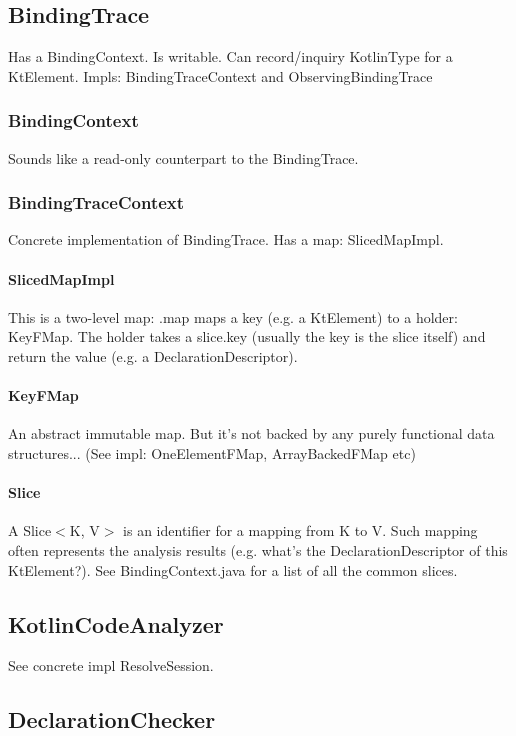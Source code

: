 \documentclass{article}
\begin{document}
\subsection{BindingTrace}
Has a BindingContext. Is writable. Can record/inquiry KotlinType for a KtElement.
Impls: BindingTraceContext and ObservingBindingTrace

\subsubsection{BindingContext}

Sounds like a read-only counterpart to the BindingTrace.

\subsubsection{BindingTraceContext}
Concrete implementation of BindingTrace. Has a map: SlicedMapImpl.

\paragraph{SlicedMapImpl} This is a two-level map: .map maps a key (e.g. a KtElement) to a holder: KeyFMap. The holder takes a slice.key (usually the key is the slice itself) and return the value (e.g. a DeclarationDescriptor).

\paragraph{KeyFMap} An abstract immutable map. But it's not backed by any purely functional data structures... (See impl: OneElementFMap, ArrayBackedFMap etc)

\paragraph{Slice}
A Slice$<$K, V$>$ is an identifier for a mapping from K to V. Such mapping often represents the analysis results (e.g. what's the DeclarationDescriptor of this KtElement?). See BindingContext.java for a list of all the common slices.

\subsection{KotlinCodeAnalyzer}
See concrete impl ResolveSession.

\subsection{DeclarationChecker}
\end{document}
